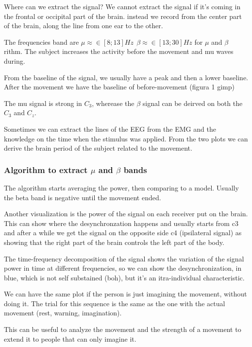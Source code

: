 Where can we extract the signal? We cannot extract the signal if it's coming in the frontal or occipital part of the brain. instead we record from the center part of the brain, along the line from one ear to the other.

The frequencies band are $ \mu \approx \in [8;13]Hz ~~\beta \approx \in [13;30]Hz$ for $\mu$ and $\beta$ rithm. The subject increases the activity before the movement and mu waves during.

From the baseline of the signal, we usually have a peak and then a lower baseline. After the movement we have the baseline of before-movement (figura 1 gimp)

The mu signal is strong in $C_3$, wherease the $\beta$ signal can be deirved on both the $C_3$ and $C_z$.

Sometimes we can extract the lines of the EEG from the EMG and the knowledge on the time when the stimulus was applied. From the two plots we can derive the brain period of the subject related to the movement.

\subsubsection{Algorithm to extract $\mu$ and $\beta$ bands}

The algorithm starts averaging the power, then comparing to a model. Usually the beta band is negative until the movement ended.

Another visualization is the power of the signal on each receiver put on the brain. This can show where the desynchronzation happens and usually starts from c3 and after a while we get the signal on the opposite side c4 (ipsilateral signal) as showing that the right part of the brain controls the left part of the body.

The time-frequency decomposition of the signal shows the variation of the signal power in time at different frequencies, so we can show the desynchronization, in blue, which is not self substained (boh), but it's an itra-individual characteristic.

We can have the same plot if the person is just imagining the movement, without doing it. The trial for this sequence is the same as the one with the actual movement (rest, warning, imagination).

This can be useful to analyze the movement and the strength of a movement to extend it to people that can only imagine it.

